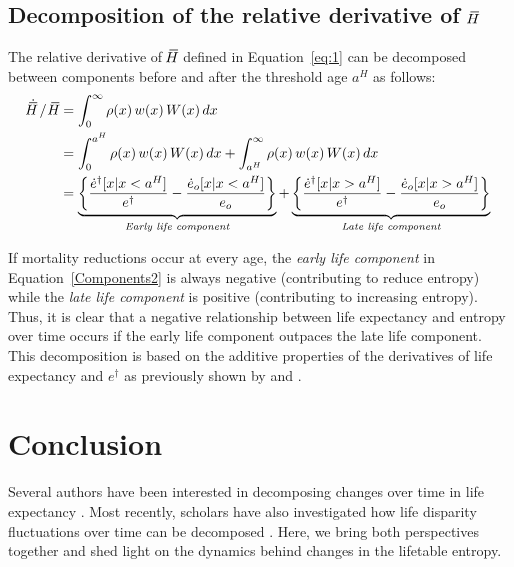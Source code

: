 \documentclass[a4paper,twoside, openright, 12pt, leqno]{article}
\newcommand*\xbar[1]{%
   \hbox{%
     \vbox{%
       \hrule height 0.5pt %
       \kern0.3ex%
       \hbox{%
         \kern-0.28em%
         \ensuremath{#1}%
         \kern-0.05em%
       }%
     }%
   }%
}
\begin{document}
\FloatBarrier

\subsection{Decomposition of the relative derivative of $\,\xbar{H}$}

The relative derivative of $\,\xbar{H}$ defined in Equation~\eqref{eq:1} can be decomposed between components before and after the threshold age $a^H$ as follows:
%
\begin{equation}
 \begin{split}
 \dot{\xbar{H}}\,/\,\,\xbar{H} &= \int_0^\infty\rho(x)\,w(x)\,W(x)\,dx\;\\
  & = \int_0^{a^H} \rho(x)\,w(x)\,W(x)\,dx + \int_{a^H}^\infty\rho(x)\,w(x)\,W(x)\,dx		 \\
		& = \underbrace{ \left\lbrace \frac{\dot{e}^\dagger[x|x < a^H]}{e^\dagger}- \frac{\dot{e}_o[x|x < a^H]}{e_o}  \right\rbrace }_{\textit{Early life component}} + \underbrace{\left\lbrace \frac{\dot{e}^\dagger[x|x > a^H]}{e^\dagger}-\frac{\dot{e}_o[x|x > a^H]}{e_o} \right\rbrace }_{\textit{Late life component}}
 \end{split}
 \label{Components2}
\end{equation}

If mortality reductions occur at every age, the \textit{early life component} in Equation~\eqref{Components2} is always negative (contributing to reduce entropy) while the \textit{late life component} is positive (contributing to increasing entropy). Thus, it is clear that a negative relationship between life expectancy and entropy over time occurs if the early life component outpaces the late life component. This decomposition is based on the additive properties of the derivatives of life expectancy and $e^\dagger$ as previously shown by \citet{Vaupel2003} and \citet{Fernandez2015}. 



\section{Conclusion}
 Several authors have been interested in decomposing changes over time in life expectancy \citep{arriaga1984measuring, Vaupel1986, pollard1988decomposition, Vaupel2003, beltran2008integrated, beltran2011unifying}. Most recently, scholars have also investigated how life disparity fluctuations over time can be decomposed \citep{Zhang2009, Wagner2010, Shkolnikov2011, Aburto2018Eastern, aburto2019upsurge}. Here, we bring both perspectives together and shed light on the dynamics behind changes in the lifetable entropy.
   
\end{document}
